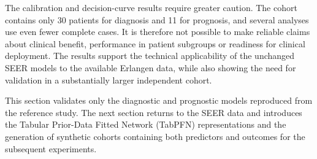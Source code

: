 The calibration and decision-curve results require greater caution. The cohort
contains only 30 patients for diagnosis and 11 for prognosis, and several
analyses use even fewer complete cases. It is therefore not possible to make
reliable claims about clinical benefit, performance in patient subgroups or
readiness for clinical deployment. The results support the technical
applicability of the unchanged SEER models to the available Erlangen data, while
also showing the need for validation in a substantially larger independent
cohort.

This section validates only the diagnostic and prognostic models reproduced from
the reference study. The next section returns to the SEER data and introduces
the Tabular Prior-Data Fitted Network (TabPFN) representations and the generation
of synthetic cohorts containing both predictors and outcomes for the subsequent
experiments.
\FloatBarrier
